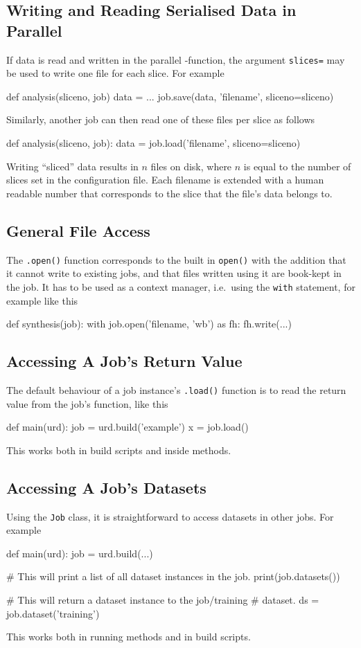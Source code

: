 \subsection{Writing and Reading Serialised Data in Parallel}
\label{sec:sliced_files}
If data is read and written in the parallel \analysis-function, the
argument \texttt{slices=} may be used to write one file for each
slice.  For example
\begin{python}
def analysis(sliceno, job)
    data = ...
    job.save(data, 'filename', sliceno=sliceno)
\end{python}
Similarly, another job can then read one of these files per slice as follows
\begin{python}
def analysis(sliceno, job):
    data = job.load('filename', sliceno=sliceno)
\end{python}
Writing ``sliced'' data results in $n$ files on disk, where $n$ is
equal to the number of slices set in the configuration file.  Each
filename is extended with a human readable number that corresponds to
the slice that the file's data belongs to.



\subsection{General File Access}
The \texttt{.open()} function corresponds to the built in
\texttt{open()} with the addition that it cannot write to existing
jobs, and that files written using it are book-kept in the job.  It
has to be used as a context manager, i.e.\ using the \texttt{with}
statement, for example like this
\begin{python}
def synthesis(job):
    with job.open('filename, 'wb') as fh:
        fh.write(...)
\end{python}


\subsection{Accessing A Job's Return Value}
The default behaviour of a job instance's \texttt{.load()} function is
to read the return value from the job's \synthesis function, like this
\begin{python}
def main(urd):
    job = urd.build('example')
    x = job.load()
\end{python}
This works both in build scripts and inside methods.


\subsection{Accessing A Job's Datasets}
Using the \texttt{Job} class, it is straightforward to access datasets
in other jobs.  For example
\begin{python}
def main(urd):
    job = urd.build(...)

    # This will print a list of all dataset instances in the job.
    print(job.datasets())

    # This will return a dataset instance to the job/training
    # dataset.
    ds = job.dataset('training')
\end{python}
This works both in running methods and in build scripts.


